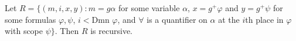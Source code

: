 Let $R = \{(m, i, x, y) : m = g\alpha$ for some variable $\alpha$, $x = g^+\varphi$ and $y = g^+\psi$ for some formulas $\varphi, \psi$, $i < \text{Dmn }\varphi$, and $\forall$ is a quantifier on $\alpha$ at the $i$th place in $\varphi$ with scope $\psi\}$. Then $R$ is recursive.
